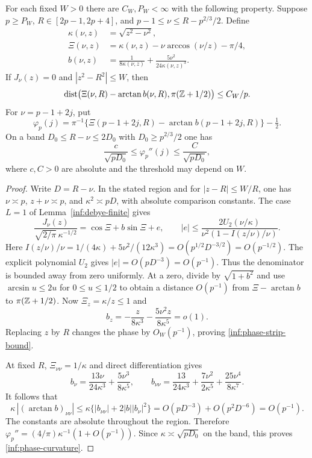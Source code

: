 \begin{lemma}\label{inf:phase-strip}
For each fixed $W>0$ there are $C_W,P_W<\infty$ with the following
property. Suppose $p\ge P_W$, $R\in[2p-1,2p+4]$, and
$p-1\le\nu\le R-p^{2/3}/2$. Define
\begin{align}
 \kappa(\nu,z)&=\sqrt{z^2-\nu^2},\nonumber\\
 \Xi(\nu,z)&=\kappa(\nu,z)-\nu\arccos(\nu/z)-\pi/4,\label{inf:phase-def}\\
 b(\nu,z)&=\frac1{8\kappa(\nu,z)}+
                       \frac{5\nu^2}{24\kappa(\nu,z)^3}.\nonumber
\end{align}
If $J_\nu(z)=0$ and $|z^2-R^2|\le W$, then
\begin{equation}\label{inf:phase-strip-bound}
 \operatorname{dist}\bigl(\Xi(\nu,R)-\arctan b(\nu,R),
                   \pi(\mathbb{Z}+1/2)\bigr)\le C_W/p.
\end{equation}
For $\nu=p-1+2j$, put
\begin{equation}\label{inf:phase-graph}
 \varphi_p(j)=\pi^{-1}\{\Xi(p-1+2j,R)
                    -\arctan b(p-1+2j,R)\}-\tfrac12.
\end{equation}
On a band $D_0\le R-\nu\le2D_0$ with
$D_0\ge p^{2/3}/2$ one has
\begin{equation}\label{inf:phase-curvature}
 \frac{c}{\sqrt{pD_0}}\le\varphi_p''(j)
 \le\frac{C}{\sqrt{pD_0}},
\end{equation}
where $c,C>0$ are absolute and the threshold may depend on $W$.
\end{lemma}
\begin{proof}
Write $D=R-\nu$. In the stated region and for
$|z-R|\le W/R$, one has $\nu\asymp p$, $z+\nu\asymp p$, and
$\kappa^2\asymp pD$, with absolute comparison constants. The case
$L=1$ of Lemma~\ref{inf:debye-finite} gives
\[
 \frac{J_\nu(z)}{\sqrt{2/\pi}\,\kappa^{-1/2}}
 =\cos\Xi+b\sin\Xi+e,\qquad
 |e|\le\frac{2U_2(\nu/\kappa)}{\nu^2(1-I(z/\nu)/\nu)}.
\]
Here
$I(z/\nu)/\nu=1/(4\kappa)+5\nu^2/(12\kappa^3)
=O(p^{1/2}D^{-3/2})=O(p^{-1/2})$.
The explicit polynomial $U_2$ gives
$|e|=O(pD^{-3})=O(p^{-1})$. Thus the denominator is bounded away
from zero uniformly. At a zero, divide by $\sqrt{1+b^2}$ and use
$\arcsin u\le2u$ for $0\le u\le1/2$ to obtain a distance
$O(p^{-1})$ from $\Xi-\arctan b$ to $\pi(\mathbb{Z}+1/2)$.
Now $\Xi_z=\kappa/z\le1$ and
\[
 b_z=-\frac z{8\kappa^3}-\frac{5\nu^2z}{8\kappa^5}=o(1).
\]
Replacing $z$ by $R$ changes the phase by $O_W(p^{-1})$, proving
\eqref{inf:phase-strip-bound}.

At fixed $R$, $\Xi_{\nu\nu}=1/\kappa$ and direct differentiation gives
\[
 b_\nu=\frac{13\nu}{24\kappa^3}+\frac{5\nu^3}{8\kappa^5},\qquad
 b_{\nu\nu}=\frac{13}{24\kappa^3}
               +\frac{7\nu^2}{2\kappa^5}
               +\frac{25\nu^4}{8\kappa^7}.
\]
It follows that
\[
 \kappa\,| (\arctan b)_{\nu\nu}|
 \le\kappa\{|b_{\nu\nu}|+2|b||b_\nu|^2\}
 =O(pD^{-3})+O(p^2D^{-6})=O(p^{-1}).
\]
The constants are absolute throughout the region. Therefore
$\varphi_p''=(4/\pi)\kappa^{-1}(1+O(p^{-1}))$.
Since $\kappa\asymp\sqrt{pD_0}$ on the band, this proves
\eqref{inf:phase-curvature}.
\end{proof}

